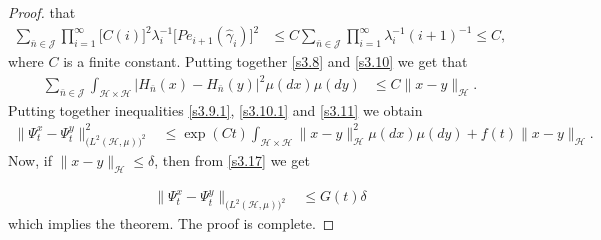 \documentclass[review, onefignum, onetabnum]{siamart171218}
\begin{document}
\begin{proof}
that
\begin{align}
    \label{s3.10}
  \sum_{\bar n\in \mathcal{J}}  \prod_{i=1}^\infty \Big[C(i)\Big]^2 
  \lambda_i^{-1} \Big[Pe_{i+1}(\hat \gamma_i)\Big]^2 & \le C \sum_{\bar n\in 
    \mathcal{J}}  \prod_{i=1}^\infty 
  \lambda_i^{-1}(i+1)^{-1} 
  \le C,
\end{align}
where $C$ is a finite constant. Putting together \eqref{s3.8} and 
\eqref{s3.10} 
we get that
\begin{align}
  \sum_{\bar n\in \mathcal{J}} \int_{\mathcal{H}\times \mathcal{H}}  \big| 
  H_{\bar n}(x) -H_{\bar n}(y) \big|^2 \mu(dx)\mu(dy) &\le 
  C \| x-y\|_{\mathcal{H}}. \label{s3.11}
\end{align}
Putting together inequalities \eqref{s3.9.1}, \eqref{s3.10.1} and 
\eqref{s3.11} 
we obtain 
\begin{align}
  \| \Psi_t^x-\Psi_t^y\|_{\big(L^2(\mathcal{H},\mu) \big)^2}^2&\le   \exp(Ct)  
  \int_{\mathcal{H}\times \mathcal{H}} 
  \| x-y\|_{\mathcal{H}}^2 \mu(dx)\mu(dy) +  f(t)\| x-y\|_{\mathcal{H}}. 
  \label{s3.17}
\end{align}
Now, if $\| x-y\|_{\mathcal{H}}\le \delta $, then from \eqref{s3.17} we get

\begin{align}
 \| \Psi_t^x-\Psi_t^y\|_{\big(L^2(\mathcal{H},\mu) \big)^2} &\le 
  G(t) \delta  \label{s3.12}
\end{align}
which implies the theorem. The proof is complete.
\end{proof}
\end{document}

